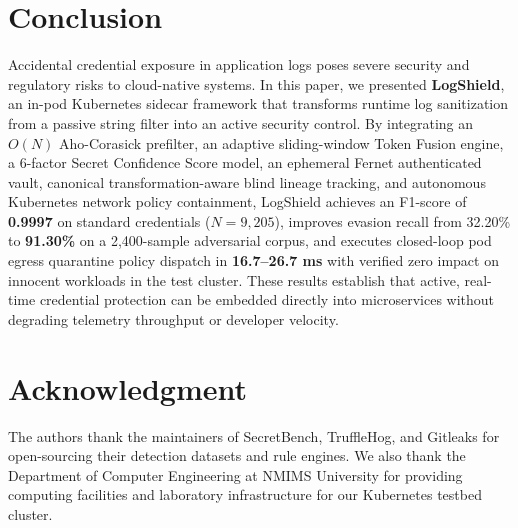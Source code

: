 \documentclass[conference]{IEEEtran}
\begin{document}
\section{Conclusion}
Accidental credential exposure in application logs poses severe security and regulatory risks to cloud-native systems. In this paper, we presented \textbf{LogShield}, an in-pod Kubernetes sidecar framework that transforms runtime log sanitization from a passive string filter into an active security control. By integrating an $O(N)$ Aho-Corasick prefilter, an adaptive sliding-window Token Fusion engine, a 6-factor Secret Confidence Score model, an ephemeral Fernet authenticated vault, canonical transformation-aware blind lineage tracking, and autonomous Kubernetes network policy containment, LogShield achieves an F1-score of \textbf{0.9997} on standard credentials ($N=9,205$), improves evasion recall from 32.20\% to \textbf{91.30\%} on a 2,400-sample adversarial corpus, and executes closed-loop pod egress quarantine policy dispatch in \textbf{16.7--26.7 ms} with verified zero impact on innocent workloads in the test cluster. These results establish that active, real-time credential protection can be embedded directly into microservices without degrading telemetry throughput or developer velocity.

\section*{Acknowledgment}
The authors thank the maintainers of SecretBench, TruffleHog, and Gitleaks for open-sourcing their detection datasets and rule engines. We also thank the Department of Computer Engineering at NMIMS University for providing computing facilities and laboratory infrastructure for our Kubernetes testbed cluster.
\end{document}
